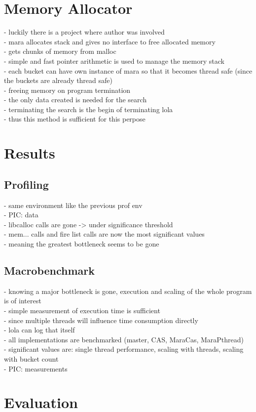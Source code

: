 \section{Memory Allocator}
- luckily there is a project where author was involved\\
- mara allocates stack and gives no interface to free allocated memory\\
- gets chunks of memory from malloc\\
- simple and fast pointer arithmetic is used to manage the memory stack\\
- each bucket can have own instance of mara so that it becomes thread safe (since the buckets are already thread safe)\\
- freeing memory on program termination\\
- the only data created is needed for the search\\
- terminating the search is the begin of terminating lola\\
- thus this method is sufficient for this perpose\\ 

\section{Results}
\subsection{Profiling}
- same environment like the previous prof env\\
- PIC: data\\
- libcalloc calls are gone -> under significance threshold\\
- mem... calls and fire list calls are now the most significant values\\
- meaning the greatest bottleneck seems to be gone\\

\subsection{Macrobenchmark}
- knowing a major bottleneck is gone, execution and scaling of the whole program is of interest\\
- simple measurement of execution time is sufficient\\
- since multiple threads will influence time consumption directly\\
- lola can log that itself\\
- all implementations are benchmarked (master, CAS, MaraCas, MaraPthread)\\
- significant values are: single thread performance, scaling with threads, scaling with bucket count\\
- PIC: measurements\\

\section{Evaluation}